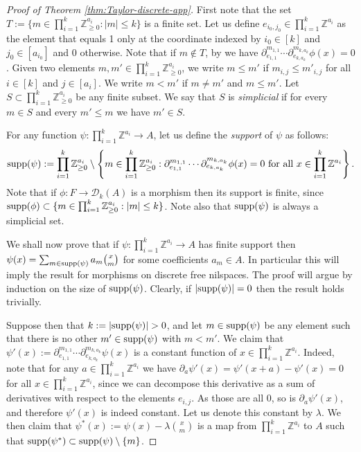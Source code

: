 \documentclass[a4paper,12pt,reqno]{amsart}
\theoremstyle{definition}
\def\supp{{\rm supp}}
\def\to{\rightarrow}
\newcommand{\mc}{\mathcal}
\newcommand{\mb}{\mathbb}
\begin{document}
\begin{proof}[Proof of Theorem \ref{thm:Taylor-discrete-app}]
First note that the set $T:=\{m\in \prod_{i=1}^k \mb{Z}_{\ge 0}^{a_i}: |m|\le k\}$ is a finite set. Let us define $e_{i_0,j_0}\in \prod_{i=1}^k \mb{Z}^{a_i}$ as the element that equals 1 only at the coordinate indexed by $i_0\in[k]$ and $j_0\in[a_{i_0}]$ and 0 otherwise. Note that if $m\notin T$, by \cite[Theorem 2.2.14]{Cand:Notes1} we have $\partial_{e_{1,1}}^{m_{1,1}}\cdots \partial_{e_{k,a_k}}^{m_{k,a_k}}\phi(x)=0$.
Given two elements $m,m'\in \prod_{i=1}^k \mb{Z}_{\ge 0}^{a_i}$, we write $m\le m'$ if $m_{i,j}\le m'_{i,j}$ for all $i\in[k]$ and $j\in[a_i]$. We write $m<m'$ if $m\not=m'$ and $m\le m'$. Let $S\subset \prod_{i=1}^k \mb{Z}_{\ge 0}^{a_i}$ be any finite subset. We say that $S$ is \emph{simplicial} if for every $m\in S$ and every $m'\le m$ we have $m'\in S$. 

For any function $\psi:\prod_{i=1}^k \mb{Z}^{a_i}\to A$, let us define the \emph{support} of $\psi$ as follows:
\[
\supp(\psi):=\prod_{i=1}^k \mb{Z}_{\ge 0}^{a_i}\setminus\left\{m \in \prod_{i=1}^k \mb{Z}_{\ge 0}^{a_i}: \partial_{e_{1,1}}^{m_{1,1}}\cdots \partial_{e_{k,a_k}}^{m_{k,a_k}}\phi(x)=0 \text{ for all }x\in \prod_{i=1}^k \mb{Z}^{a_i}\right\}.
\]
Note that if $\phi:F\to \mc{D}_k(A)$ is a morphism then its support is finite, since $\supp(\phi)\subset \{m \in \prod_{i=1}^k \mb{Z}_{\ge 0}^{a_i}:|m|\le k\}$.  Note also that $\supp(\psi)$ is always a simplicial set.

We shall now prove that if $\psi:\prod_{i=1}^k \mb{Z}^{a_i}\to A$ has finite support then $\psi(x)=\sum_{m\in \supp(\psi)}a_m \binom{x}{m}$ for some coefficients $a_m\in A$. In particular this will imply the result for morphisms on discrete free nilspaces. The proof will argue by induction on the size of $\supp(\psi)$. Clearly, if $|\supp(\psi)|=0$ then the result holds trivially.

Suppose then that $k:=|\supp(\psi)|>0$, and let $m\in \supp(\psi)$ be any element such that there is no other $m'\in \supp(\psi)$ with $m<m'$. We claim that $\psi'(x):=\partial_{e_{1,1}}^{m_{1,1}}\cdots \partial_{e_{k,a_k}}^{m_{k,a_k}}\psi(x)$ is a constant  function of $x\in \prod_{i=1}^k \mb{Z}^{a_i}$. Indeed, note that for any $a\in \prod_{i=1}^k \mb{Z}^{a_i}$ we have $\partial_a \psi'(x)=\psi'(x+a)-\psi'(x)=0$ for all $x\in \prod_{i=1}^k \mb{Z}^{a_i}$, since we can decompose this derivative as a sum of derivatives with respect to the elements $e_{i,j}$. As those are all 0,  so is $\partial_a\psi'(x)$, and therefore $\psi'(x)$ is indeed constant. Let us denote this constant by $\lambda$. 
We then claim that $\psi^*(x):=\psi(x)-\lambda\binom{x}{m}
$ is a map from $\prod_{i=1}^k \mb{Z}^{a_i}$ to $A$ such that $\supp(\psi^*)\subset \supp(\psi)\setminus \{m\}$.


\end{proof}
\end{document}
